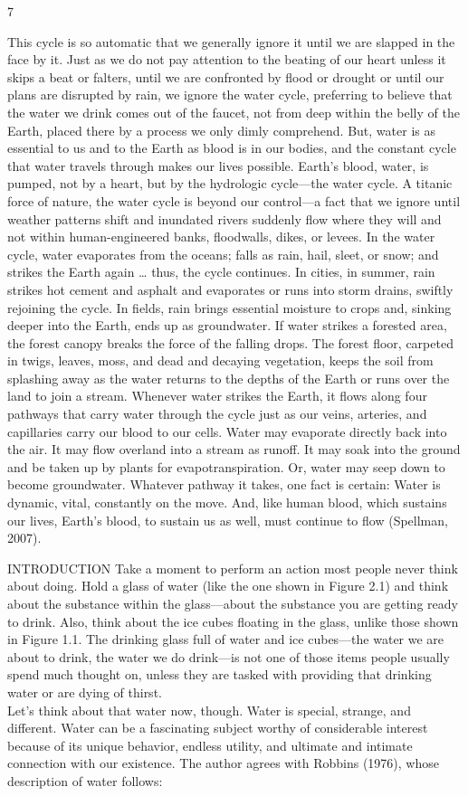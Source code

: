 \documentclass{article}
\begin{document}
7

This cycle is so automatic that we generally ignore it until we are
slapped in the face by it. Just as we do not pay attention to the
beating of our heart unless it skips a beat or falters, until we are
confronted by flood or drought or until our plans are disrupted by rain,
we ignore the water cycle, preferring to believe that the water we drink
comes out of the faucet, not from deep within the belly of the Earth,
placed there by a process we only dimly comprehend. But, water is as
essential to us and to the Earth as blood is in our bodies, and the
constant cycle that water travels through makes our lives possible.
Earth's blood, water, is pumped, not by a heart, but by the hydrologic
cycle---the water cycle. A titanic force of nature, the water cycle is
beyond our control---a fact that we ignore until weather patterns shift
and inundated rivers suddenly flow where they will and not within
human-engineered banks, floodwalls, dikes, or levees. In the water
cycle, water evaporates from the oceans; falls as rain, hail, sleet, or
snow; and strikes the Earth again \ldots{} thus, the cycle continues. In
cities, in summer, rain strikes hot cement and asphalt and evaporates or
runs into storm drains, swiftly rejoining the cycle. In fields, rain
brings essential moisture to crops and, sinking deeper into the Earth,
ends up as groundwater. If water strikes a forested area, the forest
canopy breaks the force of the falling drops. The forest floor, carpeted
in twigs, leaves, moss, and dead and decaying vegetation, keeps the soil
from splashing away as the water returns to the depths of the Earth or
runs over the land to join a stream. Whenever water strikes the Earth,
it flows along four pathways that carry water through the cycle just as
our veins, arteries, and capillaries carry our blood to our cells. Water
may evaporate directly back into the air. It may flow overland into a
stream as runoff. It may soak into the ground and be taken up by plants
for evapotranspiration. Or, water may seep down to become groundwater.
Whatever pathway it takes, one fact is certain: Water is dynamic, vital,
constantly on the move. And, like human blood, which sustains our lives,
Earth's blood, to sustain us as well, must continue to flow (Spellman,
2007).

INTRODUCTION Take a moment to perform an action most people never think
about doing. Hold a glass of water (like the one shown in Figure 2.1)
and think about the substance within the glass---about the substance you
are getting ready to drink. Also, think about the ice cubes floating in
the glass, unlike those shown in Figure 1.1. The drinking glass full of
water and ice cubes---the water we are about to drink, the water we do
drink---is not one of those items people usually spend much thought on,
unless they are tasked with providing that drinking water or are dying
of thirst.\\
Let's think about that water now, though. Water is special, strange, and
different. Water can be a fascinating subject worthy of considerable
interest because of its unique behavior, endless utility, and ultimate
and intimate connection with our existence. The author agrees with
Robbins (1976), whose description of water follows:
\end{document}
